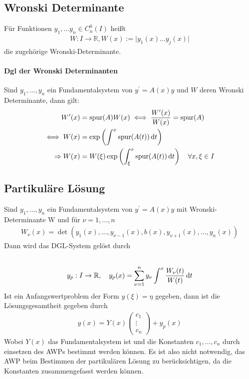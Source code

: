 \subsection{Wronski Determinante}
\label{subsec:wronski-det}
Für Funktionen $y_1, \dots y_n \in C^{0}_n(I)$ heißt 
\begin{align*}
    W:I\rightarrow \mathbb{R}, W(x):= \vert y_1(x) \dots y_j(x) \vert
\end{align*}
die zugehörige Wronski-Determinante.

\paragraph{Dgl der Wronski Determinanten}
Sind $y_1, \dots, y_n$ ein Fundamentalsystem von $y^\prime = A(x)y$ und $W$ deren Wronski Determinante, dann gilt:
\begin{align*}
    W^\prime(x) &= \text{spur}(A) W(x)
    \iff \frac{W^\prime(x)}{W(x)} = \text{spur}(A) \\
    \iff W(x) &= \exp \left( \int^x \text{spur}(A(t)) \mathop{}\!\mathrm{d} t \right) \\
    \Rightarrow W(x) &= W(\xi) \exp \left( \int_\xi^x \text{spur}(A(t)) \mathop{}\!\mathrm{d} t \right )
     \text{\quad} \forall x,\xi \in I 
\end{align*}

\subsection{Partikuläre Lösung}
Sind $y_1, \dots, y_n$ ein Fundamentalsystem von $y^\prime = A(x)y$ mit Wronski-Determinante W und für $\nu = 1,\dots,n$ 
\begin{align*}
    W_{\nu}(x) = \det{\left(y_1(x),\dots,y_{\nu-1}(x),b(x),y_{\nu+1}(x),\dots,y_n(x)\right)}
\end{align*}
Dann wird das DGL-System gelöst durch
\begin{align*}
    \\
     y_p:I\rightarrow\mathbb{R},\quad y_p(x) = \sum\limits_{\nu=1}^{n} y_{\nu} \int^x \frac{W_{\nu}(t)}{W(t)} \mathop{}\!\mathrm{d} t
\end{align*}
Ist ein Anfangswertproblem der Form $y(\xi) = \eta$ gegeben, dann ist die Lösungsgesamtheit gegeben durch 
\begin{align*}
    y(x) = Y(x)
    \begin{pmatrix}
    c_1\\
    \vdots \\
    c_n
    \end{pmatrix}
    + y_p(x)
\end{align*}
Wobei $Y(x)$ das Fundamentalsystem ist und die Konstanten $c_1,\dots, c_n$ durch einsetzen des AWPs bestimmt werden können. Es ist also nicht notwendig, das AWP beim Bestimmen der partikulären Lösung zu berücksichtigen, da die Konstanten zusammengefasst werden können. 


